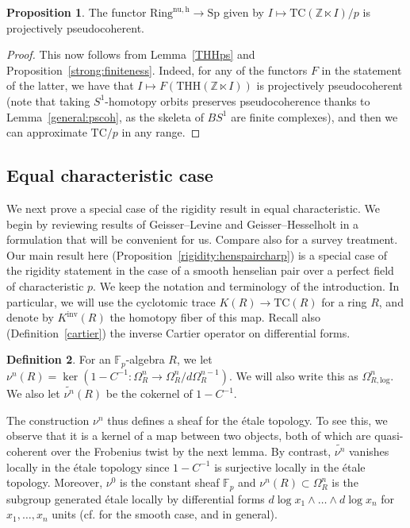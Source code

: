 \documentclass{amsart}
\newcommand{\knf}{K^{\mathrm{inv}}}
\newcommand{\THH}{\mathrm{THH}}
\newcommand{\Sp}{\mathrm{Sp}}
\theoremstyle{definition}
\newtheorem{definition}{Definition}[section]
\newtheorem{proposition}[definition]{Proposition}
\newcommand{\TC}{\mathrm{TC}}
\newcommand{\nuzh}{\mathrm{Ring}^{\mathrm{nu,h}}}
\begin{document}
\begin{proposition} 
\label{TCpscoh}
The functor $\nuzh \to \Sp$ given by $I \mapsto \TC( \mathbb{Z} \ltimes I)/p$ 
is projectively pseudocoherent. 
\end{proposition} 
\begin{proof} 
This now follows 
from Lemma~\ref{THHps} and Proposition~\ref{strong:finiteness}. Indeed, for
any of the functors $F$ in the statement of the latter, we have that $I \mapsto F(
\THH(\mathbb{Z} \ltimes I))$ is projectively pseudocoherent (note that taking
$S^1$-homotopy orbits preserves pseudocoherence thanks to
Lemma~\ref{general:pscoh}, as the skeleta of $BS^1$ are finite complexes), and then we can approximate
$\TC/p$ in any range. 
\end{proof} 

\subsection{Equal characteristic case}
\label{subsec:equalchar}


We next prove a special case of the rigidity result in equal characteristic. 
We begin by reviewing results of Geisser--Levine \cite{GL} and
Geisser--Hesselholt \cite{GH} in a formulation that will be convenient for us.
Compare also \cite{Geissersurvey} for a survey treatment. 
Our main result here (Proposition~\ref{rigidity:henspaircharp}) is a special
case of the rigidity statement in the case of a smooth henselian pair over a
perfect field of characteristic $p$. 
We keep the notation and terminology of the introduction. In particular, we will
use the cyclotomic trace $K(R) \to \TC(R)$ for a ring $R$, and denote by
$\knf(R)$ the homotopy fiber of this map. 
Recall also 
(Definition~\ref{cartier}) the inverse Cartier operator on differential forms. 

\begin{definition} 
For an $\mathbb{F}_p$-algebra $R$, we let 
$\nu^n(R) = \ker( 1 - C^{-1}: \Omega^n_R \to \Omega^n_R / d \Omega^{n-1}_R)$. We
will also write this as $\Omega^n_{R, \mathrm{log}}$. 
We also let $\widetilde{\nu^n}(R)$ be the cokernel of $1 - C^{-1}$. 
\end{definition} 

The construction $\nu^n$ thus defines a sheaf for the \'etale topology.
To see this, we observe that it is a kernel of a map between two objects, both
of which are quasi-coherent over the Frobenius twist by the next lemma. By contrast,
$\widetilde{\nu^n}$ vanishes locally in the \'etale topology since $1 -
C^{-1}$ is surjective locally in the \'etale topology.  
Moreover, $\nu^0$ is the constant sheaf $\mathbb{F}_p$ and $\nu^n(R) \subset
\Omega^n_R$ is the subgroup generated \'etale locally by differential forms $d
\log x_1 \wedge \dots \wedge d \log x_n$ for $x_1, \dots, x_n$ units (cf.
\cite[Thm.~2.4.2]{illusie-derham-witt} for the smooth case, and \cite[Cor.~4.2]{Morrow-HW} in general). 
\end{document}
